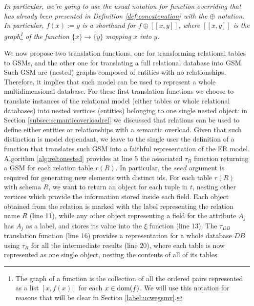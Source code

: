 \textit{\label{def:doublesquarednotation}In particular, we're going to use the usual notation for function overriding \cite{Nielson05} that has already been presented in Definition \vref{def:concatenation} with the $\oplus$ notation. In particular, $f(x):=y$ is a shorthand for $f\oplus [[x, y]]$, where $[[x, y]]$ is the  graph\footnote{The graph of a function is the collection of all the ordered pairs represented as a list $[x,f(x)]$ for each $x\in\operatorname{dom}(f)$. We will use this notation for reasons that will be clear in Section \vref{label:ucwegsmv}.} of the function $\{x\}\to \{y\}$ mapping $x$ into $y$.}



We now propose two translation functions, one for transforming relational tables to GSMs, and the other one for translating a full relational database into GSM. Such GSM are (nested) graphs composed of entities with no relationships. Therefore, it implies that such model can be used to represent a whole multidimensional database. For these first translation functions we choose to translate instances of the relational model (either tables or whole relational databases) into nested vertices (entities) belonging to one single nested object: in Section \vref{subsec:semanticoverloadrel} we discussed that relations can be used to define either entities or relationships with a semantic overload. Given that such distinction is model dependant, we leave to the single user the definition of a function that translates such GSM into a faithful representation of the ER model. Algorithm \vref{alg:reltonested} provides at line 5 the associated $\tau_R$ function returning a GSM for each relation table $r(R)$. In particular, the $seed$ argument is required for generating new elements with distinct ids. 
For each table $r(R)$ with schema $R$, we want to return an object for each tuple in $t$, nesting other vertices which provide the information stored inside each field. Each object obtained from the relation is marked with the  label representing  the relation name $R$ (line 11), while any other object representing a field for the attribute $A_j$ has $A_j$ as a label, and stores its value into the $\xi$ function (line 13).  
The $\tau_{DB}$ translation function (line 16)  provides a representation for a whole database $DB$ using $\tau_R$ for all the intermediate results (line 20), where each table is now represented as one single object, nesting the contents of all of its tables.


